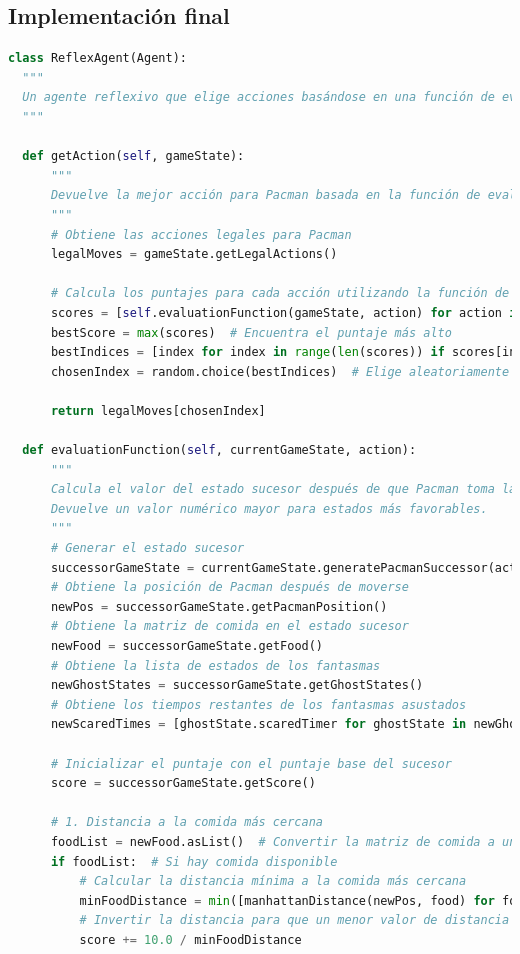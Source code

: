 \documentclass{report}
\begin{document}
        \subsection*{Implementación final}
          \begin{lstlisting}[language=Python, caption=Implementación final del agente reflex]
class ReflexAgent(Agent):
  """
  Un agente reflexivo que elige acciones basándose en una función de evaluación.
  """

  def getAction(self, gameState):
      """
      Devuelve la mejor acción para Pacman basada en la función de evaluación.
      """
      # Obtiene las acciones legales para Pacman
      legalMoves = gameState.getLegalActions()

      # Calcula los puntajes para cada acción utilizando la función de evaluación
      scores = [self.evaluationFunction(gameState, action) for action in legalMoves]
      bestScore = max(scores)  # Encuentra el puntaje más alto
      bestIndices = [index for index in range(len(scores)) if scores[index] == bestScore]
      chosenIndex = random.choice(bestIndices)  # Elige aleatoriamente entre las mejores acciones

      return legalMoves[chosenIndex]

  def evaluationFunction(self, currentGameState, action):
      """
      Calcula el valor del estado sucesor después de que Pacman toma la acción `action`.
      Devuelve un valor numérico mayor para estados más favorables.
      """
      # Generar el estado sucesor
      successorGameState = currentGameState.generatePacmanSuccessor(action)
      # Obtiene la posición de Pacman después de moverse
      newPos = successorGameState.getPacmanPosition()
      # Obtiene la matriz de comida en el estado sucesor
      newFood = successorGameState.getFood()
      # Obtiene la lista de estados de los fantasmas
      newGhostStates = successorGameState.getGhostStates()
      # Obtiene los tiempos restantes de los fantasmas asustados
      newScaredTimes = [ghostState.scaredTimer for ghostState in newGhostStates]

      # Inicializar el puntaje con el puntaje base del sucesor
      score = successorGameState.getScore()

      # 1. Distancia a la comida más cercana
      foodList = newFood.asList()  # Convertir la matriz de comida a una lista de posiciones
      if foodList:  # Si hay comida disponible
          # Calcular la distancia mínima a la comida más cercana
          minFoodDistance = min([manhattanDistance(newPos, food) for food in foodList])
          # Invertir la distancia para que un menor valor de distancia dé un mayor puntaje
          score += 10.0 / minFoodDistance


\end{lstlisting}
\end{document}
